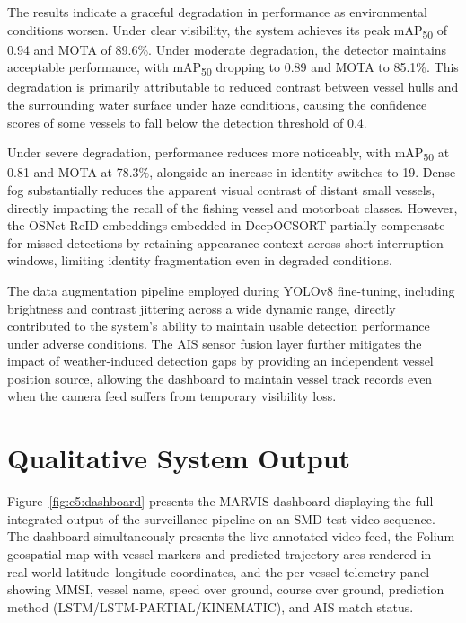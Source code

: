 The results indicate a graceful degradation in performance as environmental conditions worsen. Under clear visibility, the system achieves its peak mAP\textsubscript{50} of 0.94 and MOTA of 89.6\%. Under moderate degradation, the detector maintains acceptable performance, with mAP\textsubscript{50} dropping to 0.89 and MOTA to 85.1\%. This degradation is primarily attributable to reduced contrast between vessel hulls and the surrounding water surface under haze conditions, causing the confidence scores of some vessels to fall below the detection threshold of 0.4.

Under severe degradation, performance reduces more noticeably, with mAP\textsubscript{50} at 0.81 and MOTA at 78.3\%, alongside an increase in identity switches to 19. Dense fog substantially reduces the apparent visual contrast of distant small vessels, directly impacting the recall of the fishing vessel and motorboat classes. However, the OSNet ReID embeddings embedded in DeepOCSORT partially compensate for missed detections by retaining appearance context across short interruption windows, limiting identity fragmentation even in degraded conditions.

The data augmentation pipeline employed during YOLOv8 fine-tuning, including brightness and contrast jittering across a wide dynamic range, directly contributed to the system's ability to maintain usable detection performance under adverse conditions. The AIS sensor fusion layer further mitigates the impact of weather-induced detection gaps by providing an independent vessel position source, allowing the dashboard to maintain vessel track records even when the camera feed suffers from temporary visibility loss.

\section{Qualitative System Output}

Figure~\ref{fig:c5:dashboard} presents the MARVIS dashboard displaying 
the full integrated output of the surveillance pipeline on an SMD test 
video sequence. The dashboard simultaneously presents the live annotated 
video feed, the Folium geospatial map with vessel markers and predicted 
trajectory arcs rendered in real-world latitude--longitude coordinates, 
and the per-vessel telemetry panel showing MMSI, vessel name, speed over 
ground, course over ground, prediction method 
(LSTM/LSTM-PARTIAL/KINEMATIC), and AIS match status.

